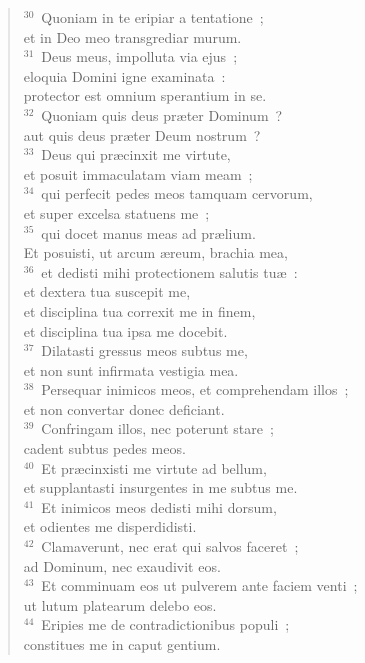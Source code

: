 \begin{flushleft}
\begin{verse}
${}^{30}$~Quoniam in te eripiar a tentatione~;\\ et in Deo meo transgrediar murum.\\
${}^{31}$~Deus meus, impolluta via ejus~;\\ eloquia Domini igne examinata~:\\ protector est omnium sperantium in se.\\
${}^{32}$~Quoniam quis deus pr\ae ter Dominum~?\\ aut quis deus pr\ae ter Deum nostrum~?\\
${}^{33}$~Deus qui pr\ae cinxit me virtute,\\ et posuit immaculatam viam meam~;\\
${}^{34}$~qui perfecit pedes meos tamquam cervorum,\\ et super excelsa statuens me~;\\
${}^{35}$~qui docet manus meas ad pr\ae lium.\\ Et posuisti, ut arcum \ae reum, brachia mea,\\
${}^{36}$~et dedisti mihi protectionem salutis tu\ae~:\\ et dextera tua suscepit me,\\ et disciplina tua correxit me in finem,\\ et disciplina tua ipsa me docebit.\\
${}^{37}$~Dilatasti gressus meos subtus me,\\ et non sunt infirmata vestigia mea.\\
${}^{38}$~Persequar inimicos meos, et comprehendam illos~;\\ et non convertar donec deficiant.\\
${}^{39}$~Confringam illos, nec poterunt stare~;\\ cadent subtus pedes meos.\\
${}^{40}$~Et pr\ae cinxisti me virtute ad bellum,\\ et supplantasti insurgentes in me subtus me.\\
${}^{41}$~Et inimicos meos dedisti mihi dorsum,\\ et odientes me disperdidisti.\\
${}^{42}$~Clamaverunt, nec erat qui salvos faceret~;\\ ad Dominum, nec exaudivit eos.\\
${}^{43}$~Et comminuam eos ut pulverem ante faciem venti~;\\ ut lutum platearum delebo eos.\\
${}^{44}$~Eripies me de contradictionibus populi~;\\ constitues me in caput gentium.\\

\end{verse}
\end{flushleft}

